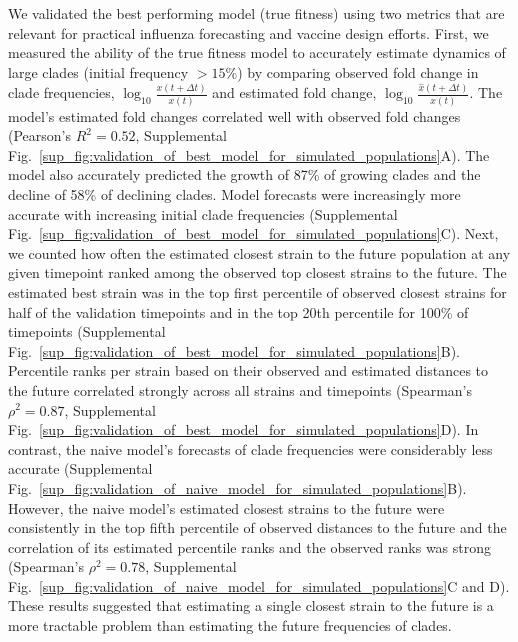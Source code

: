We validated the best performing model (true fitness) using two metrics that are relevant for practical influenza forecasting and vaccine design efforts.
First, we measured the ability of the true fitness model to accurately estimate dynamics of large clades (initial frequency $>15\%$) by comparing observed fold change in clade frequencies, $\log_{10}{\frac{x(t + \Delta{t})}{x(t)}}$ and estimated fold change, $\log_{10}{\frac{\hat{x}(t + \Delta{t})}{x(t)}}$.
The model's estimated fold changes correlated well with observed fold changes (Pearson's $R^2 = 0.52$, Supplemental Fig.~\ref{sup_fig:validation_of_best_model_for_simulated_populations}A).
The model also accurately predicted the growth of 87\% of growing clades and the decline of 58\% of declining clades.
Model forecasts were increasingly more accurate with increasing initial clade frequencies (Supplemental Fig.~\ref{sup_fig:validation_of_best_model_for_simulated_populations}C).
Next, we counted how often the estimated closest strain to the future population at any given timepoint ranked among the observed top closest strains to the future.
The estimated best strain was in the top first percentile of observed closest strains for half of the validation timepoints and in the top 20th percentile for 100\% of timepoints (Supplemental Fig.~\ref{sup_fig:validation_of_best_model_for_simulated_populations}B).
Percentile ranks per strain based on their observed and estimated distances to the future correlated strongly across all strains and timepoints (Spearman's $\rho^2 = 0.87$, Supplemental Fig.~\ref{sup_fig:validation_of_best_model_for_simulated_populations}D).
In contrast, the naive model's forecasts of clade frequencies were considerably less accurate (Supplemental Fig.~\ref{sup_fig:validation_of_naive_model_for_simulated_populations}B).
However, the naive model's estimated closest strains to the future were consistently in the top fifth percentile of observed distances to the future and the correlation of its estimated percentile ranks and the observed ranks was strong (Spearman's $\rho^2 = 0.78$, Supplemental Fig.~\ref{sup_fig:validation_of_naive_model_for_simulated_populations}C and D).
These results suggested that estimating a single closest strain to the future is a more tractable problem than estimating the future frequencies of clades.

